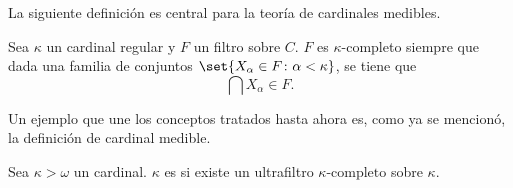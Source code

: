 La siguiente definición es central para la teoría de cardinales medibles.

\begin{defi}
    Sea $\kappa$ un cardinal regular y $F$ un filtro sobre $C$.
    $F$ es $\kappa$-completo siempre que dada una familia de conjuntos
    $\set{X_\alpha\in F\colon \alpha<\kappa}$,
    se tiene que
    \[
        \bigcap X_\alpha \in F.
    \]
\end{defi}

Un ejemplo que une los conceptos tratados hasta ahora es, como ya se mencionó,
la definición de cardinal medible.

\begin{defi}
    Sea $\kappa > \omega$ un cardinal. $\kappa$ es  si existe
    un ultrafiltro $\kappa\text{-completo}$ sobre $\kappa$.
\end{defi}





